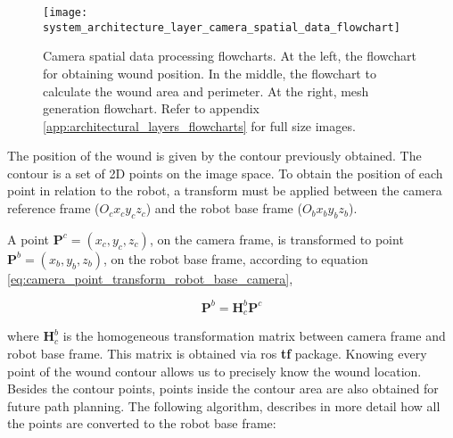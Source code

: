 \begin{figure}[htbp]
	\centering
	\texttt{[image: system\_architecture\_layer\_camera\_spatial\_data\_flowchart]}
	\caption{Camera spatial data processing flowcharts. At the left, the flowchart for obtaining wound position. In the middle, the flowchart to calculate the wound area and perimeter. At the right, mesh generation flowchart. Refer to appendix \ref{app:architectural_layers_flowcharts} for full size images.}
	\label{fig:system_architecture_layer_camera_spatial_data_flowchart}
\end{figure}

The position of the wound is given by the contour previously obtained. The contour is a set of 2D points on the image space. To obtain the position of each point in relation to the robot, a transform must be applied between the camera reference frame ($O_cx_cy_cz_c$) and the robot base frame ($O_bx_by_bz_b$).

A point $\boldsymbol{P}^c = (x_c, y_c, z_c)$, on the camera frame, is transformed to point $\boldsymbol{P}^b = (x_b, y_b, z_b)$, on the robot base frame, according to equation \ref{eq:camera_point_transform_robot_base_camera},

\begin{equation}
\boldsymbol{P}^b = \boldsymbol{H}^b_c \boldsymbol{P}^c
\label{eq:camera_point_transform_robot_base_camera}
\end{equation}

where $\boldsymbol{H}^b_c$ is the homogeneous transformation matrix between camera frame and robot base frame. This matrix is obtained via \gls{ros} \textbf{tf} package. Knowing every point of the wound contour allows us to precisely know the wound location.\\

Besides the contour points, points inside the contour area are also obtained for future path planning. The following algorithm, describes in more detail how all the points are converted to the robot base frame:

